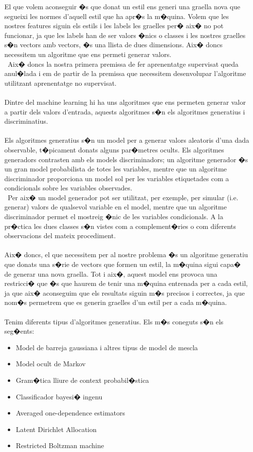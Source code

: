 \documentclass[12pt,a4paper,openright,oneside]{article}
\numberwithin{equation}{section}
\theoremstyle{definition}
\begin{document}
El que volem aconseguir �s que donat un estil ens generi una graella nova que segueixi les normes d'aquell estil que ha apr�s la m�quina. Volem que les nostres features siguin els estils i les labels les graelles per� aix� no pot funcionar, ja que les labels han de ser valors �nics o classes i les nostres graelles s�n vectors amb vectors, �s una llista de dues dimensions. Aix� doncs necessitem un algoritme que ens permeti generar valors.  \\\
Aix� doncs la nostra primera premissa de fer aprenentatge supervisat queda anul�lada i em de partir de la premissa que necessitem desenvolupar l'algoritme utilitzant aprenentatge no supervisat.\\\\
Dintre del machine learning hi ha uns algoritmes que ens permeten generar valor a partir dels valors d'entrada, aquests algoritmes s�n els algoritmes generatius i discriminatius.\\\\
Els algoritmes generatius s�n un model per a generar valors aleatoris d'una dada observable, t�picament donats alguns par�metres ocults. Els algoritmes generadors contrasten amb els models discriminadors; un algoritme generador �s un gran model probabilista de totes les variables, mentre que un algoritme discriminador proporciona un model sol per les variables etiquetades com a condicionals sobre les variables observades. \\\
Per aix� un model generador pot ser utilitzat, per exemple, per simular (i.e. generar) valors de qualsevol variable en el model, mentre que un algoritme discriminador permet el mostreig �nic de les variables condicionals. A la pr�ctica les dues classes s�n vistes com a complement�ries o com diferents observacions del mateix procediment.\\\\
Aix� doncs, el que necessitem per al nostre problema �s un algoritme generatiu que donats una s�rie de vectors que formen un estil, la m�quina sigui capa� de generar una nova graella. Tot i aix�, aquest model ens provoca una restricci� que �s que haurem de tenir una m�quina entrenada per a cada estil, ja que aix� aconseguim que els resultats siguin m�s precisos i correctes, ja que nom�s permetrem que es generin graelles d'un estil per a cada m�quina.\\\\
Tenim diferents tipus d'algoritmes generatius. Els m�s coneguts s�n els seg�ents:
\begin{itemize}
\item Model de barreja gaussiana i altres tipus de model de mescla
\item Model ocult de Markov
\item Gram�tica lliure de context probabil�stica
\item Classificador bayesi� ingenu
\item Averaged one-dependence estimators
\item Latent Dirichlet Allocation
\item Restricted Boltzman machine
\end{itemize}
\end{document}
